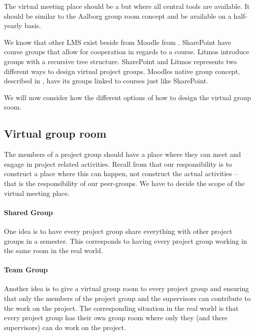 The virtual meeting place should be a but where all central tools are available. It should be similar to the Aalborg group room concept and be available on a half-yearly basis.  

We know that other LMS exist beside from Moodle from . 
SharePoint have course groups that allow for cooperation in regards to a course. Litmos introduce groups with a recursive tree structure. SharePoint and Litmos represents two different ways to design virtual project groups. Moodles native group concept, described in , have its groups linked to courses just like SharePoint.   \\




We will now consider how the different options of how to design the virtual group room.

\subsection{Virtual group room}
The members of a project group should have a place where they can meet and engage in project related activities.
Recall from  that our responsibility is to construct a place where this can happen, not construct the actual activities -- that is the responsibility of our peer-groups.
We have to decide the scope of the virtual meeting place.

\paragraph{Shared Group} One idea is to have every project group share everything with other project groups in a semester.
This corresponds to having every project group working in the same room in the real world.

\paragraph{Team Group} Another idea is to give a virtual group room to every project group and ensuring that only the members of the project group and the supervisors can contribute to the work on the project.
The corresponding situation in the real world is that every project group has their own group room where only they (and there supervisors) can do work on the project. \\

